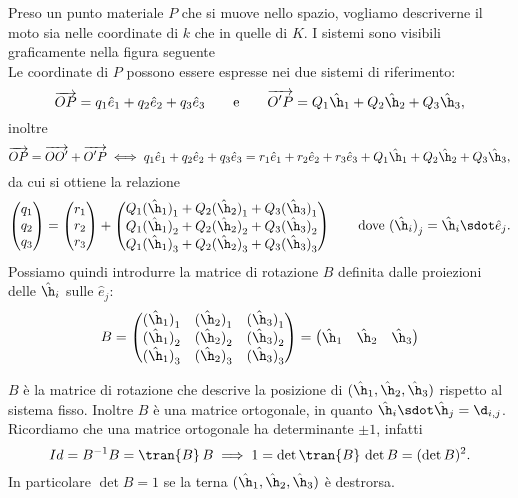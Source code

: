 Preso un punto materiale \(P\) che si muove nello spazio, vogliamo descriverne il moto sia nelle coordinate di \(k\) che in quelle di \(K\). I sistemi sono visibili graficamente nella figura seguente
\[
	
\]
Le coordinate di \(P\) possono essere espresse nei due sistemi di riferimento:
\[
	\overrightarrow{OP} = q_1\hat{e}_1 + q_2\hat{e}_2 + q_3\hat{e}_3 \qquad\text{e}\qquad \overrightarrow{O'P} = Q_1\hat{\h}_1 + Q_2\hat{\h}_2 + Q_3\hat{\h}_3,
\]
inoltre
\[
	\overrightarrow{OP} = \overrightarrow{OO'} + \overrightarrow{O'P} \iff q_1\hat{e}_1 + q_2\hat{e}_2 + q_3\hat{e}_3 = r_1\hat{e}_1 + r_2\hat{e}_2 + r_3\hat{e}_3 + Q_1\hat{\h}_1 + Q_2\hat{\h}_2 + Q_3\hat{\h}_3,
\]
da cui si ottiene la relazione
\[
	\begin{pmatrix}
		q_1 \\q_2\\q_3
	\end{pmatrix} =
	\begin{pmatrix}
		r_1 \\r_2\\r_3
	\end{pmatrix} +
	\begin{pmatrix}
		Q_1 {(\hat{\h}_1)}_1 + Q_2{(\hat{\h}_2)}_1 + Q_3{(\hat{\h}_3)}_1 \\
		Q_1 {(\hat{\h}_1)}_2 + Q_2{(\hat{\h}_2)}_2 + Q_3{(\hat{\h}_3)}_2 \\
		Q_1 {(\hat{\h}_1)}_3 + Q_2{(\hat{\h}_2)}_3 + Q_3{(\hat{\h}_3)}_3
	\end{pmatrix}
	\qquad\text{dove }{(\hat{\h}_i)}_j = \hat{\h}_i \sdot \hat{e}_j.
\]
Possiamo quindi introdurre la matrice di rotazione \(B\) definita dalle proiezioni delle \(\hat{\h}_i\) sulle \(\hat{e}_j\):
\[
	B = \begin{pmatrix}
		{(\hat{\h}_1)}_1 & {(\hat{\h}_2)}_1 & {(\hat{\h}_3)}_1  \\
		{(\hat{\h}_1)}_2 & {(\hat{\h}_2)}_2 & {(\hat{\h}_3)}_2  \\
		{(\hat{\h}_1)}_3 & {(\hat{\h}_2)}_3 & {(\hat{\h}_3)}_3
	\end{pmatrix} =
	\begin{pmatrix}
		\hat{\h}_1 & \hat{\h}_2 & \hat{\h}_3
	\end{pmatrix}
\]

\begin{oss}
	\(B\) è la matrice di rotazione che descrive la posizione di \((\hat{\h}_1,\hat{\h}_2,\hat{\h}_3)\) rispetto al sistema fisso.
	Inoltre \(B\) è una matrice ortogonale, in quanto \(\hat{\h}_i \sdot \hat{\h}_j = \d_{i,j}\).
	Ricordiamo che una matrice ortogonale ha determinante \(\pm 1\), infatti
	\[
		Id = B^{-1} B = \tran{B}\,B \implies 1 = \det\tran{B}\,\det B = (\det B)^2.
	\]
	In particolare \(\det B=1\) se la terna \((\hat{\h}_1,\hat{\h}_2,\hat{\h}_3)\) è destrorsa.
\end{oss}

